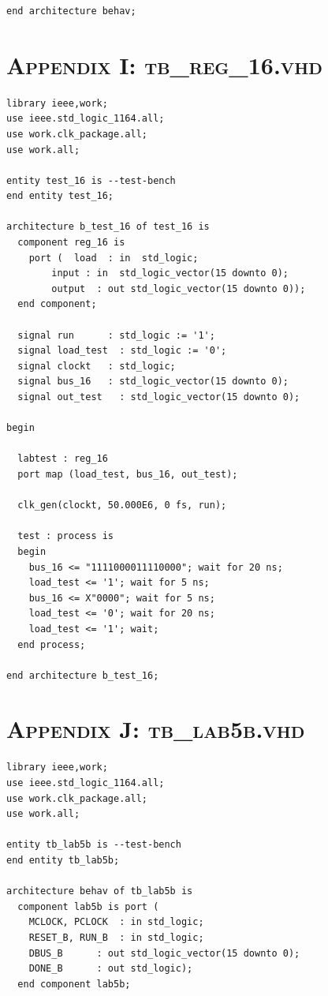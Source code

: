 \documentclass[11pt]{report}
\begin{document}
\begin{spacing}{1.5}
\begin{lstlisting}
end architecture behav;
\end{lstlisting}

\chapter*{\scshape Appendix I: tb\_reg\_16.vhd}
\label{app:a}
\vspace{15px}
\begin{lstlisting}
library ieee,work;
use ieee.std_logic_1164.all;
use work.clk_package.all;
use work.all;

entity test_16 is --test-bench
end entity test_16;

architecture b_test_16 of test_16 is
  component reg_16 is
    port (  load  : in  std_logic;
        input : in  std_logic_vector(15 downto 0);
        output  : out std_logic_vector(15 downto 0));
  end component;

  signal run      : std_logic := '1';
  signal load_test  : std_logic := '0';
  signal clockt   : std_logic;
  signal bus_16   : std_logic_vector(15 downto 0);
  signal out_test   : std_logic_vector(15 downto 0);

begin

  labtest : reg_16
  port map (load_test, bus_16, out_test);

  clk_gen(clockt, 50.000E6, 0 fs, run);

  test : process is
  begin
    bus_16 <= "1111000011110000"; wait for 20 ns;
    load_test <= '1'; wait for 5 ns;
    bus_16 <= X"0000"; wait for 5 ns;
    load_test <= '0'; wait for 20 ns;
    load_test <= '1'; wait;
  end process;

end architecture b_test_16;
\end{lstlisting}

\chapter*{\scshape Appendix J: tb\_lab5b.vhd}
\label{app:a}
\vspace{15px}
\begin{lstlisting}
library ieee,work;
use ieee.std_logic_1164.all;
use work.clk_package.all;
use work.all;

entity tb_lab5b is --test-bench
end entity tb_lab5b;

architecture behav of tb_lab5b is
  component lab5b is port (
    MCLOCK, PCLOCK  : in std_logic;
    RESET_B, RUN_B  : in std_logic;
    DBUS_B      : out std_logic_vector(15 downto 0);
    DONE_B      : out std_logic);
  end component lab5b;


\end{lstlisting}
\end{spacing}
\end{document}
